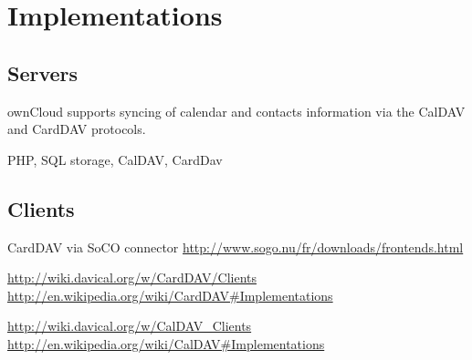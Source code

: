 \documentclass[12pt,a4paper]{scrartcl}		%
\begin{document}
\section{Implementations}


\subsection{Servers}
\begin{description}[\breaklabel\setleftmargin{1ex}]

  \item[owncloud]

    ownCloud supports syncing of calendar and contacts information via the
    CalDAV and CardDAV protocols.

  \item[DAViCal] 

    PHP, SQL storage, CalDAV, CardDav

\end{description}

\subsection{Clients}

\begin{description}[\breaklabel\setleftmargin{1ex}]

  \item[Thunderbird]

    CardDAV via SoCO connector \url{http://www.sogo.nu/fr/downloads/frontends.html}

  \item[Evolution]
  \item[Akonadi]

  \item[more CardDAV] \url{http://wiki.davical.org/w/CardDAV/Clients} \url{http://en.wikipedia.org/wiki/CardDAV#Implementations}
  \item[more CalDAV]  \url{http://wiki.davical.org/w/CalDAV_Clients} \url{http://en.wikipedia.org/wiki/CalDAV#Implementations}

\end{description}
\end{document}
